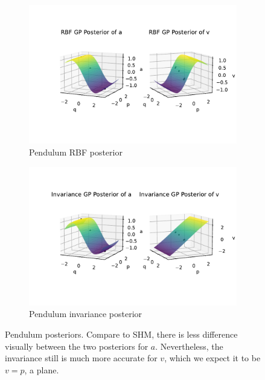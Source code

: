 \documentclass{statsmsc}
\begin{document}
\begin{figure}[H]
     \centering
     \begin{subfigure}[b]{\linewidth}
        \centering
        \includegraphics[width=\linewidth]{../codes/figures/posterior_pendulum_rbf.pdf}
        \caption{Pendulum RBF posterior}
        \label{fig:posterior_pendulum_rbf}
     \end{subfigure}
     \hfill
     \begin{subfigure}[b]{\linewidth}
         \centering
         \includegraphics[width=\linewidth]{../codes/figures/posterior_pendulum_invariance.pdf}
         \caption{Pendulum invariance posterior}
         \label{fig:posterior_pendulum_invariance}
     \end{subfigure}
        \caption{Pendulum posteriors. Compare to SHM, there is less difference visually between the two posteriors for $a$. Nevertheless, the invariance still is much more accurate for $v$, which we expect it to be $v=p$, a plane.}
        \label{fig:posterior_pendulum}
\end{figure}
\end{document}
